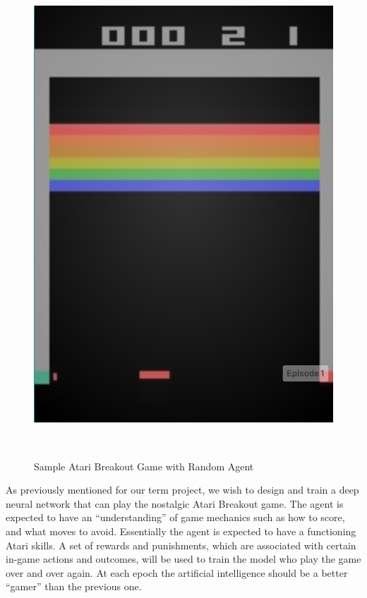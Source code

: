 \documentclass[a4paper, 12pt, conference]{IEEEtran}
\begin{document}
\begin{figure}[h]
    \centering{}
    \includegraphics[width=\linewidth, height=0.2\textheight, keepaspectratio]{img/breakout.png}
    \caption{Sample Atari\texttrademark{} Breakout Game with Random Agent~\autocite{breakout}}~\label{fig:breakout}
\end{figure}


As previously mentioned for our term project, we wish to design and train a deep neural network that can play the nostalgic Atari\texttrademark{} Breakout game. The agent is expected to have an ``understanding'' of game mechanics such as how to score, and what moves to avoid. Essentially the agent is expected to have a functioning Atari\texttrademark{} skills.
A set of rewards and punishments, which are associated with certain in-game actions and outcomes, will be used to train the model who play the game over and over again.
At each epoch the artificial intelligence should be a better ``gamer'' than the previous one.
\end{document}
